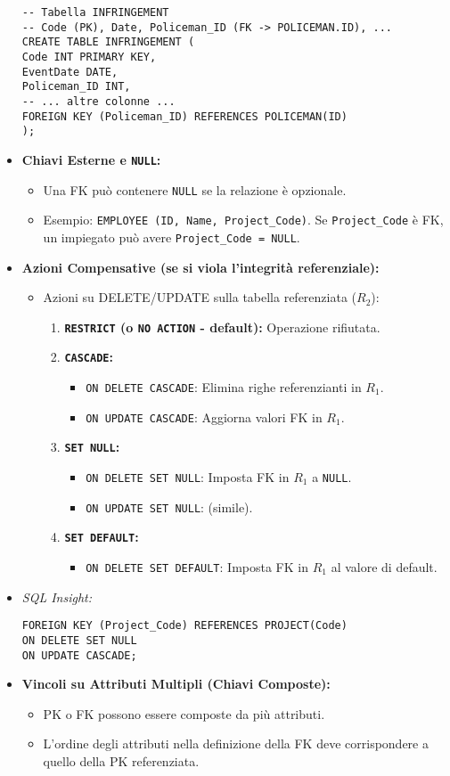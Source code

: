 \begin{itemize}
\begin{verbatim}
-- Tabella INFRINGEMENT
-- Code (PK), Date, Policeman_ID (FK -> POLICEMAN.ID), ...
CREATE TABLE INFRINGEMENT (
Code INT PRIMARY KEY,
EventDate DATE,
Policeman_ID INT,
-- ... altre colonne ...
FOREIGN KEY (Policeman_ID) REFERENCES POLICEMAN(ID)
);
	\end{verbatim}
	\item \textbf{Chiavi Esterne e \texttt{NULL}:}
	\begin{itemize}
		\item Una FK può contenere \texttt{NULL} se la relazione è opzionale.
		\item Esempio: \texttt{EMPLOYEE (ID, Name, Project\_Code)}. Se \texttt{Project\_Code} è FK, un impiegato può avere \texttt{Project\_Code = NULL}.
	\end{itemize}
	\item \textbf{Azioni Compensative (se si viola l'integrità referenziale):}
	\begin{itemize}
		\item Azioni su DELETE/UPDATE sulla tabella referenziata ($R_2$):
		\begin{enumerate}
			\item \textbf{\texttt{RESTRICT} (o \texttt{NO ACTION} - default):} Operazione rifiutata.
			\item \textbf{\texttt{CASCADE}:}
			\begin{itemize}
				\item \texttt{ON DELETE CASCADE}: Elimina righe referenzianti in $R_1$.
				\item \texttt{ON UPDATE CASCADE}: Aggiorna valori FK in $R_1$.
			\end{itemize}
			\item \textbf{\texttt{SET NULL}:}
			\begin{itemize}
				\item \texttt{ON DELETE SET NULL}: Imposta FK in $R_1$ a \texttt{NULL}.
				\item \texttt{ON UPDATE SET NULL}: (simile).
			\end{itemize}
			\item \textbf{\texttt{SET DEFAULT}:}
			\begin{itemize}
				\item \texttt{ON DELETE SET DEFAULT}: Imposta FK in $R_1$ al valore di default.
			\end{itemize}
		\end{enumerate}
	\end{itemize}
	\item \textit{SQL Insight:}
	\begin{verbatim}
FOREIGN KEY (Project_Code) REFERENCES PROJECT(Code)
ON DELETE SET NULL
ON UPDATE CASCADE;
	\end{verbatim}
	\item \textbf{Vincoli su Attributi Multipli (Chiavi Composte):}
	\begin{itemize}
		\item PK o FK possono essere composte da più attributi.
		\item L'ordine degli attributi nella definizione della FK deve corrispondere a quello della PK referenziata.
	\end{itemize}
\end{itemize}
